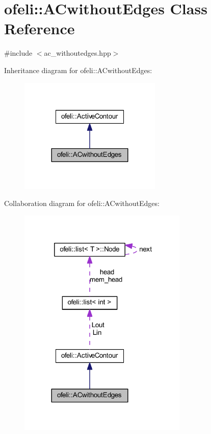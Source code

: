 \hypertarget{classofeli_1_1_a_cwithout_edges}{\section{ofeli\-:\-:A\-Cwithout\-Edges Class Reference}
\label{classofeli_1_1_a_cwithout_edges}
}


{\ttfamily \#include $<$ac\-\_\-withoutedges.\-hpp$>$}



Inheritance diagram for ofeli\-:\-:A\-Cwithout\-Edges\-:\nopagebreak
\begin{figure}[H]
\begin{center}
\leavevmode
\includegraphics[width=192pt]{classofeli_1_1_a_cwithout_edges__inherit__graph}
\end{center}
\end{figure}


Collaboration diagram for ofeli\-:\-:A\-Cwithout\-Edges\-:\nopagebreak
\begin{figure}[H]
\begin{center}
\leavevmode
\includegraphics[width=228pt]{classofeli_1_1_a_cwithout_edges__coll__graph}
\end{center}
\end{figure}
